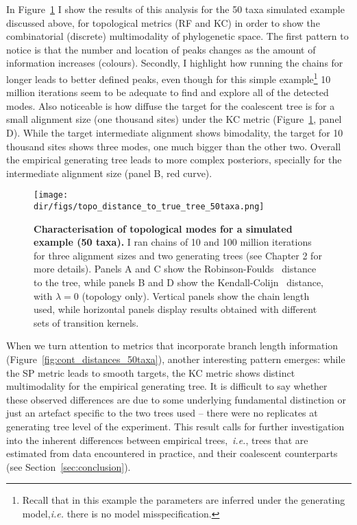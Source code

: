 In Figure~\ref{fig:topo_distances_50taxa} I show the results of this analysis for the 50 taxa simulated example discussed above, for topological metrics (RF and KC)  in order to show the combinatorial (discrete) multimodality of phylogenetic space.
The first pattern to notice is that the number and location of peaks changes as the amount of information increases (colours).
Secondly, I highlight how running the chains for longer leads to better defined peaks, even though for this simple example\footnote{Recall that in this example the parameters are inferred under the generating model,\textit{i.e.} there is no model misspecification.} 10 million iterations seem to be adequate to find and explore all of the detected modes.
Also noticeable is how diffuse the target for the coalescent tree is for a small alignment size (one thousand sites) under the KC metric (Figure~\ref{fig:topo_distances_50taxa}, panel D).
While the target intermediate alignment shows bimodality, the target for 10 thousand sites shows three modes, one much bigger than the other two.
Overall the empirical generating tree leads to more complex posteriors, specially for the intermediate alignment size (panel B, red curve).

\begin{figure}[!ht]
\begin{center}
\texttt{[image: \\dir/figs/topo\_distance\_to\_true\_tree\_50taxa.png]} 
\end{center}
 \caption[Characterisation of topological modes for a simulated example (50 taxa).]{\textbf{Characterisation of topological modes for a simulated example (50 taxa).}
  I ran chains of 10 and 100 million iterations for three alignment sizes and two generating trees (see Chapter 2 for more details).
 Panels A and C show the Robinson-Foulds~\citep{Robinson1981} distance to the tree, while panels B and D show the Kendall-Colijn~\citep{Kendall2016} distance, with $\lambda =0$ (topology only). 
 Vertical panels show the chain length used, while horizontal panels display results obtained with different sets of transition kernels.
 }
 \label{fig:topo_distances_50taxa}
\end{figure}

When we turn attention to metrics that incorporate branch length information (Figure~\ref{fig:cont_distances_50taxa}), another interesting pattern emerges: while the SP metric leads to smooth targets, the KC metric shows distinct multimodality for the empirical generating tree.
It is difficult to say whether these observed differences are due to some underlying fundamental distinction or just an artefact specific to the two trees used -- there were no replicates at generating tree level of the experiment.
This result calls for further investigation into the inherent differences between empirical trees,~\textit{i.e.}, trees that are estimated from data encountered in practice, and their coalescent counterparts (see Section~\ref{sec:conclusion}).

